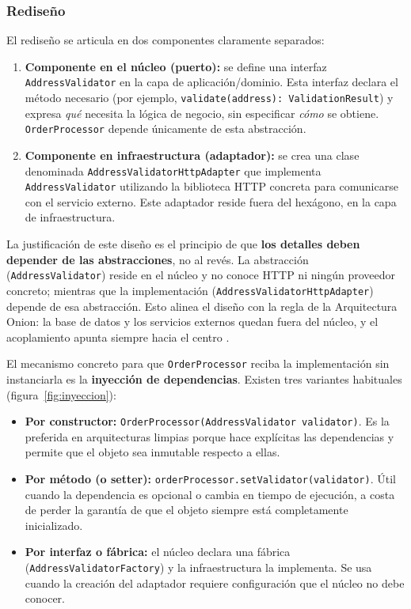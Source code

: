 \subsubsection{Rediseño}
El rediseño se articula en dos componentes claramente separados:

\begin{enumerate}
    \item \textbf{Componente en el núcleo (puerto):} se define una interfaz \texttt{AddressValidator} en la capa de aplicación/dominio. Esta interfaz declara el método necesario (por ejemplo, \texttt{validate(address): ValidationResult}) y expresa \emph{qué} necesita la lógica de negocio, sin especificar \emph{cómo} se obtiene. \texttt{OrderProcessor} depende únicamente de esta abstracción.
    \item \textbf{Componente en infraestructura (adaptador):} se crea una clase denominada \texttt{AddressValidatorHttpAdapter} que implementa \texttt{AddressValidator} utilizando la biblioteca HTTP concreta para comunicarse con el servicio externo. Este adaptador reside fuera del hexágono, en la capa de infraestructura.
\end{enumerate}

La justificación de este diseño es el principio de que \textbf{los detalles deben depender de las abstracciones}, no al revés. La abstracción (\texttt{AddressValidator}) reside en el núcleo y no conoce HTTP ni ningún proveedor concreto; mientras que la implementación (\texttt{AddressValidatorHttpAdapter}) depende de esa abstracción. Esto alinea el diseño con la regla de la Arquitectura Onion: la base de datos y los servicios externos quedan fuera del núcleo, y el acoplamiento apunta siempre hacia el centro \parencite{palermo2008onion}.

El mecanismo concreto para que \texttt{OrderProcessor} reciba la implementación sin instanciarla es la \textbf{inyección de dependencias}. Existen tres variantes habituales (figura~\ref{fig:inyeccion}):

\begin{itemize}
  \item \textbf{Por constructor:} \texttt{OrderProcessor(AddressValidator validator)}. Es la preferida en arquitecturas limpias porque hace explícitas las dependencias y permite que el objeto sea inmutable respecto a ellas.
  \item \textbf{Por método (o setter):} \texttt{orderProcessor.setValidator(validator)}. Útil cuando la dependencia es opcional o cambia en tiempo de ejecución, a costa de perder la garantía de que el objeto siempre está completamente inicializado.
  \item \textbf{Por interfaz o fábrica:} el núcleo declara una fábrica (\texttt{AddressValidatorFactory}) y la infraestructura la implementa. Se usa cuando la creación del adaptador requiere configuración que el núcleo no debe conocer.
\end{itemize}


